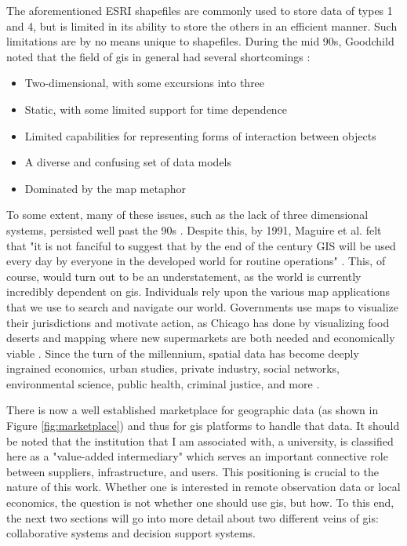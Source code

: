 The aforementioned ESRI shapefiles are commonly used to store data of types 1 and 4, but is limited in its ability to store the others in an efficient manner. Such limitations are by no means unique to shapefiles. During the mid 90s, Goodchild noted that the field of \ac{gis} in general had several shortcomings \cite{goodchildGeographicInformationSystems1994}:

\begin{itemize}
    \setlength{\itemsep}{0pt}%
    \setlength{\parskip}{0pt}%
	\item{Two-dimensional, with some excursions into three}
	\item{Static, with some limited support for time dependence}
	\item{Limited capabilities for representing forms of interaction between objects}
	\item{A diverse and confusing set of data models}
	\item{Dominated by the map metaphor}
\end{itemize}

To some extent, many of these issues, such as the lack of three dimensional systems, persisted well past the 90s \cite{goodchildTwentyYearsProgress2010}. Despite this, by 1991, Maguire et al. felt that "it is not fanciful to suggest that by the end of the century GIS will be used every day by everyone in the developed world for routine operations" \cite{maguireGeographicalInformationSystems1991}. This, of course, would turn out to be an understatement, as the world is currently incredibly dependent on \ac{gis}. Individuals rely upon the various map applications that we use to search and navigate our world. Governments use maps to visualize their jurisdictions and motivate action, as Chicago has done by visualizing food deserts and mapping where new supermarkets are both needed and economically viable \cite{goldsmithResponsiveCityEngaging2014}. Since the turn of the millennium, spatial data has become deeply ingrained economics, urban studies, private industry, social networks, environmental science, public health, criminal justice, and more \cite{goodchildSpatiallyIntegratedSocial2000}.

There is now a well established marketplace for geographic data (as shown in Figure \ref{fig:marketplace}) and thus for \ac{gis} platforms to handle that data. It should be noted that the institution that I am associated with, a university, is classified here as a "value-added intermediary" which serves an important connective role between suppliers, infrastructure, and users. This positioning is crucial to the nature of this work. Whether one is interested in remote observation data or local economics, the question is not whether one should use \ac{gis}, but how. To this end, the next two sections will go into more detail about two different veins of \ac{gis}: collaborative systems and decision support systems.


